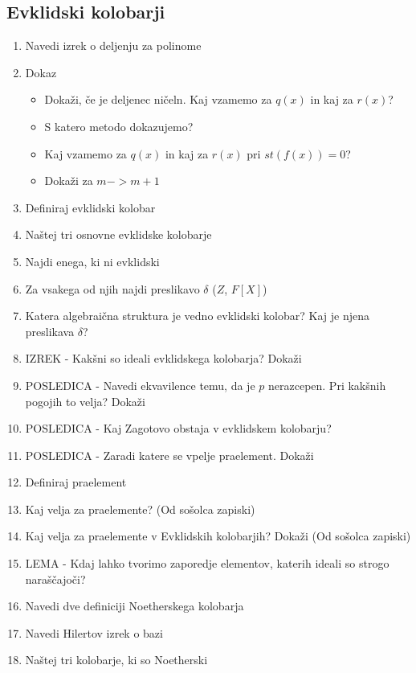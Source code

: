 \documentclass{article}
\begin{document}
    \subsection{Evklidski kolobarji}
    \begin{enumerate}
        \item Navedi izrek o deljenju za polinome
        \item Dokaz
        \begin{itemize}
            \item Dokaži, če je deljenec ničeln. Kaj vzamemo za $q(x)$ in kaj za $r(x)$?
            \item S katero metodo dokazujemo?
            \item Kaj vzamemo za $q(x)$ in kaj za $r(x)$ pri $st(f(x)) = 0$?
            \item Dokaži za $m -> m+1$
        \end{itemize}
        \item Definiraj evklidski kolobar
        \item Naštej tri osnovne evklidske kolobarje
        \item Najdi enega, ki ni evklidski
        \item Za vsakega od njih najdi preslikavo $\delta$ ($Z$, $F[X]$)
        \item Katera algebraična struktura je vedno evklidski kolobar? Kaj je njena preslikava $\delta$?
        \item IZREK - Kakšni so ideali evklidskega kolobarja? Dokaži
        \item POSLEDICA - Navedi ekvavilence temu, da je $p$ nerazcepen. Pri kakšnih pogojih to velja? Dokaži
        \item POSLEDICA - Kaj Zagotovo obstaja v evklidskem kolobarju?
        \item POSLEDICA - Zaradi katere se vpelje praelement. Dokaži
        \item Definiraj praelement
        \item Kaj velja za praelemente? (Od sošolca zapiski)
        \item Kaj velja za praelemente v Evklidskih kolobarjih?  Dokaži (Od sošolca zapiski)
        \item LEMA - Kdaj lahko tvorimo zaporedje elementov, katerih ideali so strogo naraščajoči?
        \item Navedi dve definiciji Noetherskega kolobarja
        \item Navedi Hilertov izrek o bazi
        \item Naštej tri kolobarje, ki so Noetherski

\end{enumerate}
\end{document}
